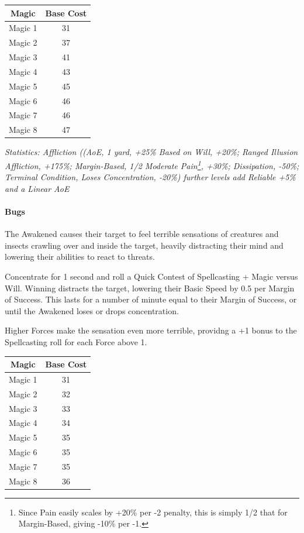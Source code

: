 \begin{multicols*}{3}
		\begin{center}
		\begin{tabular}{|c|c|}
			\hline
			Magic & Base Cost \\
			\hline
			\hline
			Magic 1 & 31 \\
			Magic 2 & 37 \\
			Magic 3 & 41 \\
			Magic 4 & 43 \\
			Magic 5 & 45 \\
			Magic 6 & 46 \\
			Magic 7 & 46 \\
			Magic 8 & 47 \\
			\hline
		\end{tabular}
	\end{center}
	
	\textcolor{OliveGreen}{\textit{Statistics: Affliction ((AoE, 1 yard, +25\% Based on Will, +20\%; Ranged Illusion Affliction, +175\%; Margin-Based, 1/2 Moderate Pain\footnote{Since Pain easily scales by +20\% per -2 penalty, this is simply 1/2 that for Margin-Based, giving -10\% per -1.}, +30\%; Dissipation, -50\%; Terminal Condition, Loses Concentration, -20\%)  further levels add Reliable +5\% and a Linear AoE}}
	
	\paragraph{Bugs}
	
	The Awakened causes their target to feel terrible sensations of creatures and insects crawling over and inside the target, heavily distracting their mind and lowering their abilities to react to threats.
	
	Concentrate for 1 second and roll a Quick Contest of Spellcasting + Magic versus Will. Winning distracts the target, lowering their Basic Speed by 0.5 per Margin of Success. This lasts for a number of minute equal to their Margin of Success, or until the Awakened loses or drops concentration.
	
	Higher Forces make the sensation even more terrible, providng a +1 bonus to the Spellcasting roll for each Force above 1.
		
	\begin{center}
		\begin{tabular}{|c|c|}
			\hline
			Magic & Base Cost \\
			\hline
			\hline
			Magic 1 & 31 \\
			Magic 2 & 32 \\
			Magic 3 & 33 \\
			Magic 4 & 34 \\
			Magic 5 & 35 \\
			Magic 6 & 35 \\
			Magic 7 & 35 \\
			Magic 8 & 36 \\
			\hline
		\end{tabular}
	\end{center}
	

\end{multicols*}
